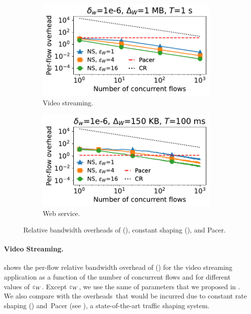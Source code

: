 \begin{figure}[t]
  \centering
  \begin{subfigure}{0.49\columnwidth}
      \centering
      \includegraphics[width=\textwidth]{plots/overhead_vs_number_of_traces_video_loglog.pdf}
      \caption{Video streaming.}
      \label{fig:video-overheads-compare}
  \end{subfigure}
  \hfill
  \begin{subfigure}{0.49\columnwidth}
      \centering
      \includegraphics[width=\textwidth]{plots/overhead_vs_number_of_traces_web_loglog.pdf}
      \caption{Web service.}
      \label{fig:web-overheads-compare}
  \end{subfigure}
  \caption{Relative bandwidth overheads of {\sys} ({\ns}), constant
      shaping ({\constshape}), and Pacer.
  }
\end{figure}

\paragraph{Video Streaming.}
 shows the per-flow relative bandwidth overhead of {\sys} ({\ns}) for the video streaming application as a function of the number of concurrent flows and for different values of $\varepsilon_{W}$.
Except $\varepsilon_{W}$, we use the same of parameters that we proposed in .
We also compare with the overheads~that would be incurred due to constant rate
shaping ({\constshape}) and~Pacer \cite{mehta2022pacer} (see ), a state-of-the-art traffic shaping system.

